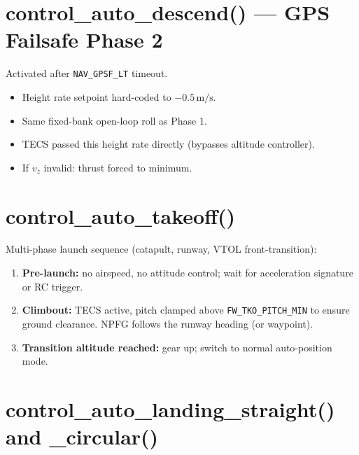 \documentclass[12pt,a4paper]{article}
\begin{document}
\section{control\_auto\_descend() --- GPS Failsafe Phase 2}

Activated after \texttt{NAV\_GPSF\_LT} timeout.

\begin{itemize}
  \item Height rate setpoint hard-coded to $-0.5\,\text{m/s}$.
  \item Same fixed-bank open-loop roll as Phase 1.
  \item TECS passed this height rate directly (bypasses altitude controller).
  \item If $v_z$ invalid: thrust forced to minimum.
\end{itemize}

\section{control\_auto\_takeoff()}

Multi-phase launch sequence (catapult, runway, VTOL front-transition):

\begin{enumerate}
  \item \textbf{Pre-launch:} no airspeed, no attitude control; wait for
        acceleration signature or RC trigger.
  \item \textbf{Climbout:} TECS active, pitch clamped above
        \texttt{FW\_TKO\_PITCH\_MIN} to ensure ground clearance.
        NPFG follows the runway heading (or waypoint).
  \item \textbf{Transition altitude reached:} gear up; switch to normal
        auto-position mode.
\end{enumerate}

\section{control\_auto\_landing\_straight() and \_circular()}
\end{document}
